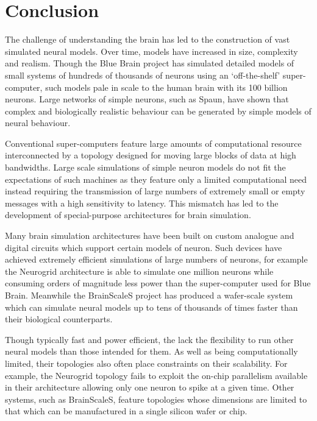 \chapter{Conclusion}
	
	The challenge of understanding the brain has led to the construction of vast
	simulated neural models. Over time, models have increased in size, complexity
	and realism. Though the Blue Brain project has simulated detailed models of
	small systems of hundreds of thousands of neurons using an `off-the-shelf'
	super-computer, such models pale in scale to the human brain with its 100
	billion neurons.  Large networks of simple neurons, such as Spaun, have shown
	that complex and biologically realistic behaviour can be generated by simple
	models of neural behaviour.
	
	Conventional super-computers feature large amounts of computational resource
	interconnected by a topology designed for moving large blocks of data at high
	bandwidths.  Large scale simulations of simple neuron models do not fit the
	expectations of such machines as they feature only a limited computational
	need instead requiring the transmission of large numbers of extremely small or
	empty messages with a high sensitivity to latency. This mismatch has led to
	the development of special-purpose architectures for brain simulation.
	
	Many brain simulation architectures have been built on custom analogue and
	digital circuits which support certain models of neuron. Such devices have
	achieved extremely efficient simulations of large numbers of neurons, for
	example the Neurogrid architecture is able to simulate one million neurons
	while consuming orders of magnitude less power than the super-computer used
	for Blue Brain. Meanwhile the BrainScaleS project has produced a wafer-scale
	system which can simulate neural models up to tens of thousands of times
	faster than their biological counterparts.
	
	Though typically fast and power efficient, the lack the flexibility to run
	other neural models than those intended for them. As well as being
	computationally limited, their topologies also often place constraints on
	their scalability. For example, the Neurogrid topology fails to exploit the
	on-chip parallelism available in their architecture allowing only one neuron
	to spike at a given time. Other systems, such as BrainScaleS, feature
	topologies whose dimensions are limited to that which can be manufactured in a
	single silicon wafer or chip.
	
